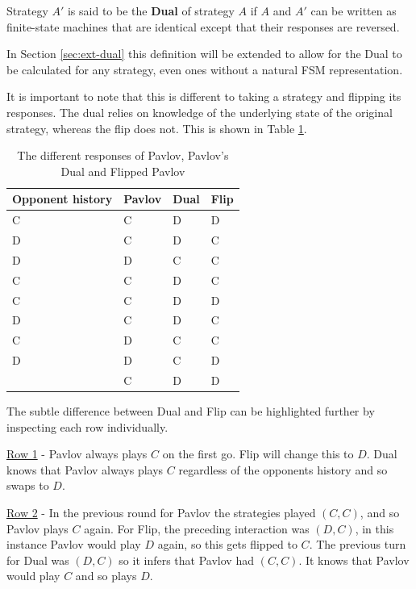 \begin{definition}\label{def:dual}
Strategy $A'$ is said to be the \textbf{Dual} of strategy $A$ if $A$ and $A'$ can be written as finite-state machines that are identical except that their responses are reversed.
\end{definition}

In Section \ref{sec:ext-dual} this definition will be extended to allow for the Dual to be calculated for any strategy, even ones without a natural FSM representation.

It is important to note that this is different to taking a strategy and flipping its responses.
The dual relies on knowledge of the underlying state of the original strategy, whereas the flip does not.
This is shown in Table \ref{tab:strat-dual-flip}.

\begin{table}[htbp]
    \centering
    \begin{tabular}{l l l l}
        \toprule
        Opponent history & Pavlov & Dual & Flip \\
        \midrule
        C & C & D & D \\
        D & C & D & C \\
        D & D & C & C \\
        C & C & D & C \\
        C & C & D & D \\
        D & C & D & C \\
        C & D & C & C \\
        D & D & C & D \\
          & C & D & D \\
        \bottomrule
    \end{tabular}
    \caption{The different responses of Pavlov, Pavlov's Dual and Flipped Pavlov}
    \label{tab:strat-dual-flip}
\end{table}

The subtle difference between Dual and Flip can be highlighted further by inspecting each row individually.

\underline{Row 1} - Pavlov always plays $C$ on the first go.
Flip will change this to $D$.
Dual knows that Pavlov always plays $C$ regardless of the opponents history and so swaps to $D$.

\underline{Row 2} - In the previous round for Pavlov the strategies played $(C, C)$, and so Pavlov plays $C$ again.
For Flip, the preceding interaction was $(D, C)$, in this instance Pavlov would play $D$ again, so this gets flipped to $C$.
The previous turn for Dual was $(D, C)$ so it infers that Pavlov had $(C, C)$.
It knows that Pavlov would play $C$ and so plays $D$.


